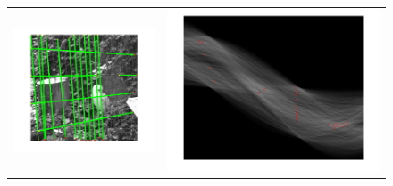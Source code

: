 \begin{figure}[h]
\begin{center}
\begin{tabular}{cc}
\includegraphics[scale=0.3]{fig/grillagesansraf.png}
& \includegraphics[scale=0.2]{fig/houghsansraf.png} \\

\end{tabular}
\end{center}
\end{figure}
